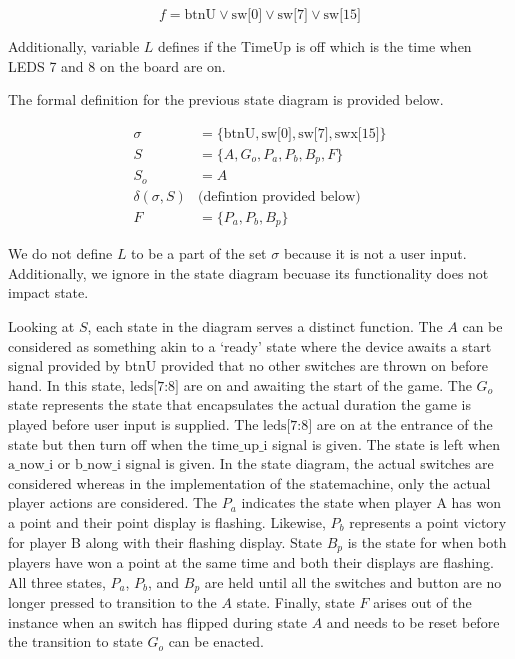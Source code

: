 \documentclass[stu,12pt,floatsintext]{apa7}
\begin{document}
\begin{equation}
  f  = \text{btnU} \vee \text{sw[0]} \vee \text{sw[7]} \vee \text{sw[15]}
\end{equation}

Additionally, variable \(L\) defines if the TimeUp is off which is the time when LEDS 7 and 8 on the board are on.

%
%


The formal definition for the previous state diagram is provided below.

\begin{align}
  \sigma                &= \{\text{btnU}, \text{sw[0]}, \text{sw[7]}, \text{swx[15]}\} \\
   S                    &= \{A, G_{o}, P_{a}, P_{b}, B_{p}, F\} \\
   S_{o}                &= A \\
   \delta(\sigma, S)  & \text{(defintion provided below)}\\
   F                    &= \{P_{a}, P_{b}, B_{p}\}
\end{align}

We do not define \(L\) to be a part of the set \(\sigma\) because it is not a user input. Additionally, we ignore  in the state diagram becuase its functionality does not impact state. 

%
%

Looking at \(S\), each state in the diagram serves a distinct function. The \(A\) can be considered as something akin to a `ready' state where the device awaits a start signal provided by \(\text{btnU}\) provided that no other switches are thrown on before hand. In this state, \(\text{leds[7:8]}\) are on and awaiting the start of the game. The \(G_{o}\) state represents the state that encapsulates the actual duration the game is played before user input is supplied. The \(\text{leds[7:8]}\) are on at the entrance of the state but then turn off when the \(\text{time\_up\_i}\) signal is given. The state is left when \(\text{a\_now\_i}\) or \(\text{b\_now\_i}\) signal is given. In the state diagram, the actual switches are considered whereas in the implementation of the statemachine, only the actual player actions are considered. The \(P_{a}\) indicates the state when player A has won a point and their point display is flashing. Likewise, \(P_{b}\) represents a point victory for player B along with their flashing display. State \(B_{p}\) is the state for when both players have won a point at the same time and both their displays are flashing. All three states, \(P_{a}\), \(P_{b}\), and \(B_{p}\) are held until all the switches and button are no longer pressed to transition to the \(A\) state. Finally, state \(F\) arises out of the instance when an switch has flipped during state \(A\) and needs to be reset before the transition to state \(G_{o}\) can be enacted. 
\end{document}
